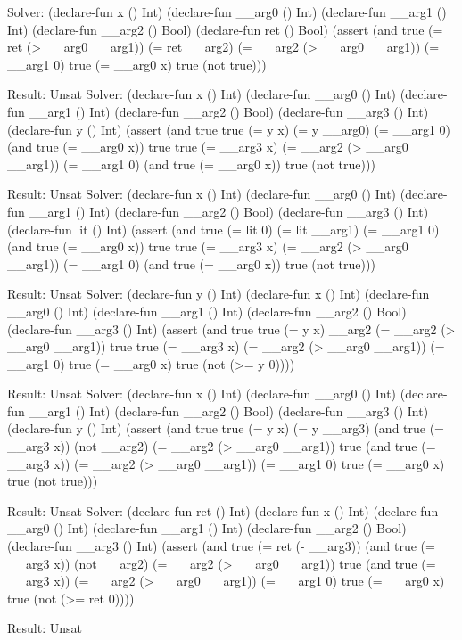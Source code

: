 \documentclass[
  oneside,
  english,
  coorientadorbanca,
  noabntexcite
]{ufsc-thesis-rn46-2019}
\begin{document}
\begin{rustcode}
Solver:
(declare-fun x () Int)
(declare-fun __arg0 () Int)
(declare-fun __arg1 () Int)
(declare-fun __arg2 () Bool)
(declare-fun ret () Bool)
(assert (and true
     (= ret (> __arg0 __arg1))
     (= ret __arg2)
     (= __arg2 (> __arg0 __arg1))
     (= __arg1 0)
     true
     (= __arg0 x)
     true
     (not true)))

Result: Unsat
Solver:
(declare-fun x () Int)
(declare-fun __arg0 () Int)
(declare-fun __arg1 () Int)
(declare-fun __arg2 () Bool)
(declare-fun __arg3 () Int)
(declare-fun y () Int)
(assert (and true
      true
      (= y x)
      (= y __arg0)
      (= __arg1 0)
      (and true (= __arg0 x))
      true
      true
      (= __arg3 x)
      (= __arg2 (> __arg0 __arg1))
      (= __arg1 0)
      (and true (= __arg0 x))
      true
      (not true)))

Result: Unsat
Solver:
(declare-fun x () Int)
(declare-fun __arg0 () Int)
(declare-fun __arg1 () Int)
(declare-fun __arg2 () Bool)
(declare-fun __arg3 () Int)
(declare-fun lit () Int)
(assert (and true
      (= lit 0)
      (= lit __arg1)
      (= __arg1 0)
      (and true (= __arg0 x))
      true
      true
      (= __arg3 x)
      (= __arg2 (> __arg0 __arg1))
      (= __arg1 0)
      (and true (= __arg0 x))
      true
      (not true)))

Result: Unsat
Solver:
(declare-fun y () Int)
(declare-fun x () Int)
(declare-fun __arg0 () Int)
(declare-fun __arg1 () Int)
(declare-fun __arg2 () Bool)
(declare-fun __arg3 () Int)
(assert (and true
      true
      (= y x)
      __arg2
      (= __arg2 (> __arg0 __arg1))
      true
      true
      (= __arg3 x)
      (= __arg2 (> __arg0 __arg1))
      (= __arg1 0)
      true
      (= __arg0 x)
      true
      (not (>= y 0))))

Result: Unsat
Solver:
(declare-fun x () Int)
(declare-fun __arg0 () Int)
(declare-fun __arg1 () Int)
(declare-fun __arg2 () Bool)
(declare-fun __arg3 () Int)
(declare-fun y () Int)
(assert (and true
      true
      (= y x)
      (= y __arg3)
      (and true (= __arg3 x))
      (not __arg2)
      (= __arg2 (> __arg0 __arg1))
      true
      (and true (= __arg3 x))
      (= __arg2 (> __arg0 __arg1))
      (= __arg1 0)
      true
      (= __arg0 x)
      true
      (not true)))

Result: Unsat
Solver:
(declare-fun ret () Int)
(declare-fun x () Int)
(declare-fun __arg0 () Int)
(declare-fun __arg1 () Int)
(declare-fun __arg2 () Bool)
(declare-fun __arg3 () Int)
(assert (and true
      (= ret (- __arg3))
      (and true (= __arg3 x))
      (not __arg2)
      (= __arg2 (> __arg0 __arg1))
      true
      (and true (= __arg3 x))
      (= __arg2 (> __arg0 __arg1))
      (= __arg1 0)
      true
      (= __arg0 x)
      true
      (not (>= ret 0))))

Result: Unsat
\end{rustcode}
\end{document}
